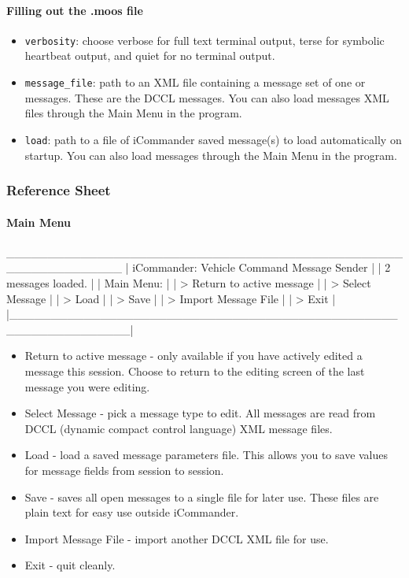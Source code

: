 \documentclass[11pt, letterpaper, oneside]{memoir}
\begin{document}
\paragraph{Filling out the .moos file}
\begin{itemize}
\item \verb|verbosity|: choose verbose for full text terminal output, terse for symbolic heartbeat output, and quiet for no terminal output.
\item \verb|message_file|: path to an XML file containing a message set of one or messages. These are the DCCL messages. You can also load messages XML files through the Main Menu in the program.
\item \verb|load|: path to a file of iCommander saved message(s) to load automatically on startup. You can also load messages through the Main Menu in the program.
\end{itemize}

\subsubsection{Reference Sheet}
\paragraph{Main Menu}
\begin{boxedverbatim}
 ______________________________________________________________
|            iCommander: Vehicle Command Message Sender        |
|                        2 messages loaded.                    |
|    Main Menu:                                                |
|    > Return to active message                                |
|    > Select Message                                          |
|    > Load                                                    |
|    > Save                                                    |
|    > Import Message File                                     |
|    > Exit                                                    |
|______________________________________________________________|
\end{boxedverbatim}
\resetbvlinenumber
\begin{itemize}
\item Return to active message - only available if you have actively edited a message this session. Choose to return to the editing screen of the last message you were editing.
\item Select Message - pick a message type to edit. All messages are read from DCCL (dynamic compact control language) XML message files.
\item Load - load a saved message parameters file. This allows you to save values for message fields from session to session.
\item Save - saves all open messages to a single file for later use. These files are plain text for easy use outside iCommander.
\item Import Message File - import another DCCL XML file for use.
\item Exit - quit cleanly.
\end{itemize}
\end{document}
